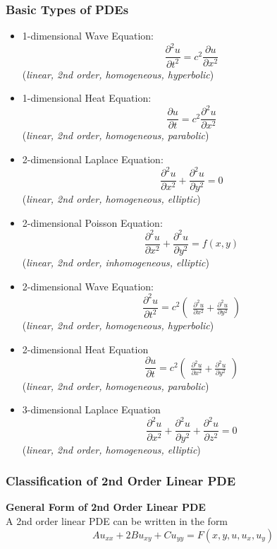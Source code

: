 \subsubsection{Basic Types of PDEs}
\begin{itemize}
    \item 1-dimensional Wave Equation:
    \[\frac{\partial ^2 u}{\partial t^2} = c^2\frac{\partial u}{\partial x^2}\]
    (\textit{linear, 2nd order, homogeneous, hyperbolic})
    \item 1-dimensional Heat Equation:
    \[\frac{\partial u}{\partial t} = c^2 \frac{\partial ^2 u}{\partial x^2}\]
    (\textit{linear, 2nd order, homogeneous, parabolic})
    \item 2-dimensional Laplace Equation:
    \[\frac{\partial^2 u}{\partial x^2}+\frac{\partial ^2 u}{\partial y^2}=0\]
    (\textit{linear, 2nd order, homogeneous, elliptic})
    \item 2-dimensional Poisson Equation:
    \[\frac{\partial^2 u}{\partial x^2}+\frac{\partial^2 u}{\partial y^2}=f(x,y)\]
    (\textit{linear, 2nd order, inhomogeneous, elliptic})
    \item 2-dimensional Wave Equation:
    \[\frac{\partial^2u}{\partial t^2}=c^2 \begin{pmatrix}
    \frac{\partial^2 u}{\partial x^2}+\frac{\partial ^2 u}{\partial y^2}
    \end{pmatrix}\]
    (\textit{linear, 2nd order, homogeneous, hyperbolic})
    \item 2-dimensional Heat Equation
    \[\frac{\partial u}{\partial t}=c^2 \begin{pmatrix}
    \frac{\partial^2 u}{\partial x^2}+\frac{\partial ^2 u}{\partial y^2}
    \end{pmatrix}\]
    (\textit{linear, 2nd order, homogeneous, parabolic})
    \item 3-dimensional Laplace Equation
    \[\frac{\partial^2 u}{\partial x^2}+\frac{\partial ^2 u}{\partial y^2}+\frac{\partial ^2 u}{\partial z^2}=0\]
    (\textit{linear, 2nd order, homogeneous, elliptic})
\end{itemize}
%
%
\subsubsection{Classification of 2nd Order Linear PDE}
\textbf{General Form of 2nd Order Linear PDE}\\
A 2nd order linear PDE can be written in the form
\[ Au_{xx}+2Bu_{xy}+Cu_{yy}=F(x,y,u,u_x,u_y)\]
%
